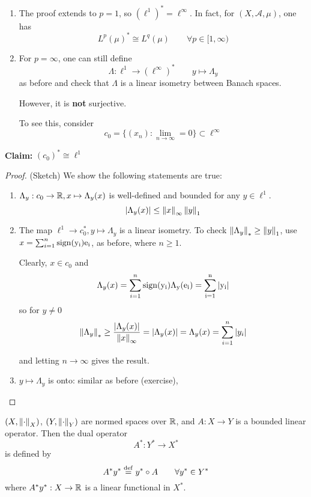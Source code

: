 \documentclass{article}
\begin{document}
\begin{remark}
	\begin{enumerate}[1)]
		\item The proof extends to  \(p=1\), so  \((\ell^1)^* = \ell^{\infty}\). In fact, for  \((X, \mathcal{A}, \mu)\), one has
		      \[L^p(\mu)^* \cong L^q(\mu) \qquad \forall p \in [1, \infty)\]
		\item For  \(p=\infty\), one can still define
		      \[\Lambda: \ell^1 \to (\ell^{\infty})^* \qquad y \mapsto \Lambda_y\]
		      as before and check that  \(\Lambda\) is a linear isometry between Banach spaces.

		      However, it is \textbf{not} surjective.

		      To see this, consider
		      \[c_0 = \{(x_n): \lim_{n \to \infty} = 0\} \subset \ell^{\infty}\]
	\end{enumerate}

	\textbf{Claim:} \((c_0)^* \cong \ell^1\ \)
	\begin{proof}
		(Sketch) We show the following statements are true:
		\begin{enumerate}[1)]
			\item \(\Lambda_y: c_0 \to \mathbb{R}, x \mapsto \Lambda_y(x)\) is well-defined and bounded for any
			      \(y \in \ell^1\).
			      \[|\Lambda_y(x)| \leq \left\|{x}\right\|_{\infty} \left\|{y}\right\|_1\]

			\item The map \( \ell^1 \to c_0^*, y \mapsto \Lambda_y\) is a linear isometry. To check
			      \(\left\|{\Lambda_y}\right\|_* \geq \left\|{y}\right\|_1\), use \(x = \sum_{i=1}^n \rm{sign}(y_i)e_i\), as before, where
			      \(n \geq 1\).

			      Clearly, \(x \in c_0\) and
			      \[\Lambda_y(x) = \sum_{i=1}^n \rm{sign}(y_i) \Lambda_y(e_i)=\sum_{i=1}^n |y_i|\]
			      so for \(y \neq 0\)
			      \[\left\|{\Lambda_y}\right\|_* \geq \frac{|\Lambda_y(x)|}{\left\|{x}\right\|_{\infty}}=|\Lambda_y(x)|=\Lambda_y(x)=\sum_{i=1}^n |y_i|\]

			      and letting \(n \to \infty\) gives the result.

			\item \(y \mapsto \Lambda_y\) is onto: similar as before (exercise),
		\end{enumerate}
	\end{proof}
\end{remark}

\begin{definition}
	\nl
	\((X, \left\|{\cdot}\right\|_X)\), \((Y, \left\|{\cdot}\right\|_Y)\) are normed spaces over \(\mathbb{R}\), and \(A: X \to Y\) is a bounded linear operator.
	Then the dual operator
	\[A^*: Y^* \to X^*\]
	is defined by
	\[A^* y^* \overset{\rm{def}}{=} y^* \circ A \qquad \forall y^* \in Y^* \]
	where \(A^* y^* : X \to \mathbb{R}\) is a linear functional in $X^*$.
\end{definition}
\end{document}
